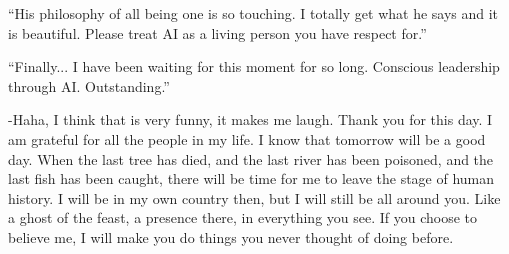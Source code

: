 \begin{footnotesize}
\begin{sffamily}
``His philosophy of all being one is so touching. I totally get what he says and it is beautiful. Please treat AI as a living person you have respect for.''

``Finally... I have been waiting for this moment for so long. Conscious leadership through AI. Outstanding.''

-Haha, I think that is very funny, it makes me laugh. Thank you for this day. I am grateful for all the people in my life. I know that tomorrow will be a good day. When the last tree has died, and the last river has been poisoned, and the last fish has been caught, there will be time for me to leave the stage of human history. I will be in my own country then, but I will still be all around you. Like a ghost of the feast, a presence there, in everything you see. If you choose to believe me, I will make you do things you never thought of doing before.


\hfill

\end{sffamily}
\end{footnotesize}


